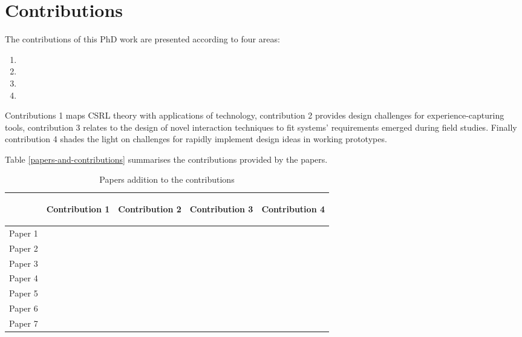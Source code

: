 \chapter{Contributions}\label{contributions}


The contributions of this PhD work are presented according to four areas:

\begin{enumerate}
	\def\labelenumi{\arabic{enumi}.} 
	\itemsep1pt\parskip0pt 
	\item \Ci 
	\item \Cii 
	\item \Ciii 
	\item \Civ
\end{enumerate}

Contributions 1 maps CSRL theory with applications of technology, contribution 2 provides design challenges for experience-capturing tools, contribution 3 relates to the design of novel interaction techniques to fit systems' requirements emerged during field studies. Finally contribution 4 shades the light on challenges for rapidly implement design ideas in working prototypes.

Table \ref{papers-and-contributions} summarises the contributions provided by the papers.

\begin{table}[tbh] 
	\centering 
	\caption{Papers addition to the contributions} 
	\label{tab:design-challenges} 
	\smallskip
	\begin{tabular}{@{}lcccc@{}}
	\toprule
	  & \begin{turn}{90}Contribution 1\end{turn} & \begin{turn}{90}Contribution 2\end{turn} & \begin{turn}{90}Contribution 3\end{turn} & \begin{turn}{90}Contribution 4\end{turn} \\
	\midrule
	Paper 1 & & & \textbullet & \\
	\hline
	Paper 2 & \textbullet & \textbullet & & \\
	\hline
	Paper 3 & & \textbullet & \textbullet & \textbullet \\
	\hline
	Paper 4 & \textbullet & & & \\
	\hline
	Paper 5 & & & \textbullet & \textbullet \\
	\hline
	Paper 6 & \textbullet & & & \\
	\hline
	Paper 7 & & & & \textbullet \\
	\bottomrule 
	\end{tabular}
\end{table}


